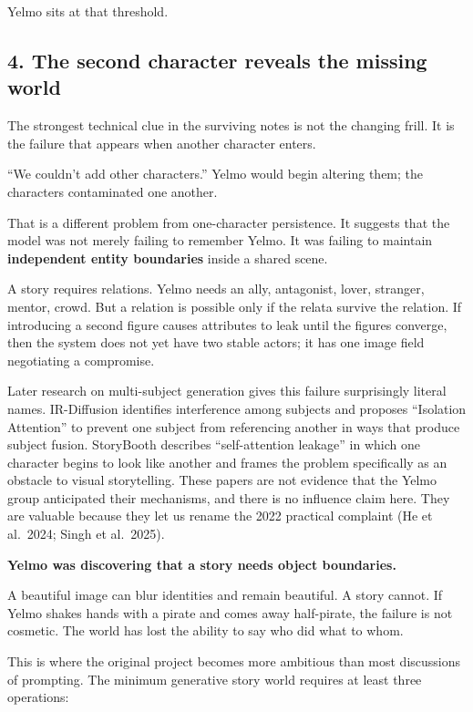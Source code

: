\documentclass[
]{article}
\begin{document}
Yelmo sits at that threshold.

\subsection{4. The second character reveals the missing
world}\label{the-second-character-reveals-the-missing-world}

The strongest technical clue in the surviving notes is not the changing
frill. It is the failure that appears when another character enters.

``We couldn't add other characters.'' Yelmo would begin altering them;
the characters contaminated one another.

That is a different problem from one-character persistence. It suggests
that the model was not merely failing to remember Yelmo. It was failing
to maintain \textbf{independent entity boundaries} inside a shared
scene.

A story requires relations. Yelmo needs an ally, antagonist, lover,
stranger, mentor, crowd. But a relation is possible only if the relata
survive the relation. If introducing a second figure causes attributes
to leak until the figures converge, then the system does not yet have
two stable actors; it has one image field negotiating a compromise.

Later research on multi-subject generation gives this failure
surprisingly literal names. IR-Diffusion identifies interference among
subjects and proposes ``Isolation Attention'' to prevent one subject
from referencing another in ways that produce subject fusion. StoryBooth
describes ``self-attention leakage'' in which one character begins to
look like another and frames the problem specifically as an obstacle to
visual storytelling. These papers are not evidence that the Yelmo group
anticipated their mechanisms, and there is no influence claim here. They
are valuable because they let us rename the 2022 practical complaint (He
et al.~2024; Singh et al.~2025).

\textbf{Yelmo was discovering that a story needs object boundaries.}

A beautiful image can blur identities and remain beautiful. A story
cannot. If Yelmo shakes hands with a pirate and comes away half-pirate,
the failure is not cosmetic. The world has lost the ability to say who
did what to whom.

This is where the original project becomes more ambitious than most
discussions of prompting. The minimum generative story world requires at
least three operations:
\end{document}
